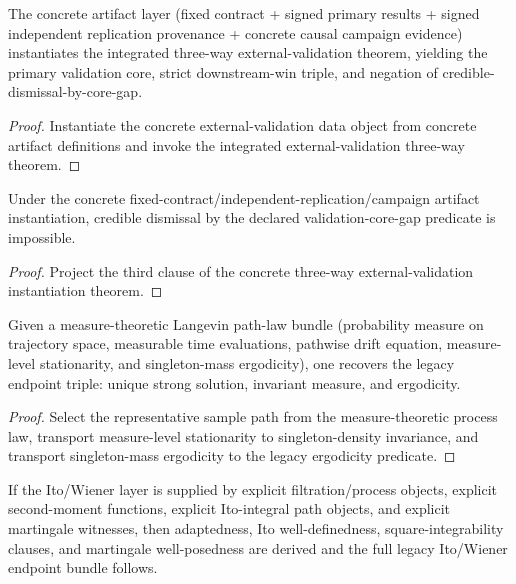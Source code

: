 \begin{theorem}\label{thm:concrete-external-validation-threeway-bundle}
The concrete artifact layer (fixed contract + signed primary results + signed independent replication provenance + concrete causal campaign evidence) instantiates the integrated three-way external-validation theorem, yielding the primary validation core, strict downstream-win triple, and negation of credible-dismissal-by-core-gap.
\end{theorem}

\begin{proof}
Instantiate the concrete external-validation data object from concrete artifact definitions and invoke the integrated external-validation three-way theorem.
\end{proof}

\begin{theorem}\label{thm:concrete-external-validation-not-credibly-dismissible}
Under the concrete fixed-contract/independent-replication/campaign artifact instantiation, credible dismissal by the declared validation-core-gap predicate is impossible.
\end{theorem}

\begin{proof}
Project the third clause of the concrete three-way external-validation instantiation theorem.
\end{proof}

\begin{theorem}\label{thm:langevin-measure-theoretic-endpoint-bundle}
Given a measure-theoretic Langevin path-law bundle (probability measure on trajectory space, measurable time evaluations, pathwise drift equation, measure-level stationarity, and singleton-mass ergodicity), one recovers the legacy endpoint triple: unique strong solution, invariant measure, and ergodicity.
\end{theorem}

\begin{proof}
Select the representative sample path from the measure-theoretic process law, transport measure-level stationarity to singleton-density invariance, and transport singleton-mass ergodicity to the legacy ergodicity predicate.
\end{proof}

\begin{theorem}\label{thm:constructive-ito-wiener-derived-endpoints}
If the Ito/Wiener layer is supplied by explicit filtration/process objects, explicit second-moment functions, explicit Ito-integral path objects, and explicit martingale witnesses, then adaptedness, Ito well-definedness, square-integrability clauses, and martingale well-posedness are derived and the full legacy Ito/Wiener endpoint bundle follows.
\end{theorem}


